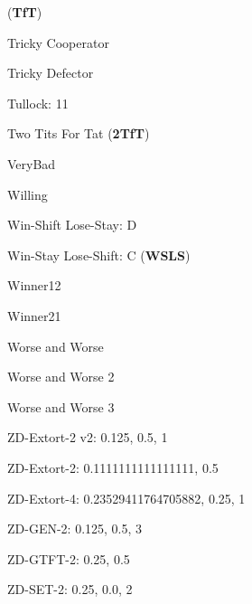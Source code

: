 (\textbf{TfT})\item Tricky Cooperator
\item Tricky Defector
\item Tullock: 11
\item Two Tits For Tat
(\textbf{2TfT})\item VeryBad
\item Willing
\item Win-Shift Lose-Stay: D
\item Win-Stay Lose-Shift: C
(\textbf{WSLS})\item Winner12
\item Winner21
\item Worse and Worse
\item Worse and Worse 2
\item Worse and Worse 3
\item ZD-Extort-2 v2: 0.125, 0.5, 1
\item ZD-Extort-2: 0.1111111111111111, 0.5
\item ZD-Extort-4: 0.23529411764705882, 0.25, 1
\item ZD-GEN-2: 0.125, 0.5, 3
\item ZD-GTFT-2: 0.25, 0.5
\item ZD-SET-2: 0.25, 0.0, 2
